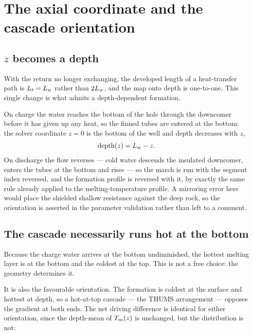 \section{The axial coordinate and the cascade orientation}
\label{sec:coordinate}

\subsection{$z$ becomes a depth}

With the return no longer exchanging, the developed length of a heat-transfer
path is $L_t = L_{w}$ rather than $2L_{w}$, and the map onto depth is one-to-one.
This single change is what admits a depth-dependent formation.

On charge the water reaches the bottom of the hole through the downcomer
before it has given up any heat, so the finned tubes are entered at the
bottom: the solver coordinate $z = 0$ is the bottom of the well and depth
decreases with $z$,
\begin{equation}
\text{depth}(z) = L_{w} - z .
\end{equation}
On discharge the flow reverses --- cold water descends the insulated
downcomer, enters the tubes at the bottom and rises --- so the march is run
with the segment index reversed, and the formation profile is reversed with
it, by exactly the same rule already applied to the melting-temperature
profile. A mirroring error here would place the shielded shallow resistance
against the deep rock, so the orientation is asserted in the parameter
validation rather than left to a comment.

\subsection{The cascade necessarily runs hot at the bottom}

Because the charge water arrives at the bottom undiminished, the hottest
melting layer is at the bottom and the coldest at the top. This is not a free
choice: the geometry determines it.

It is also the favourable orientation. The formation is coldest at the surface
and hottest at depth, so a hot-at-top cascade --- the THUMS arrangement ---
opposes the gradient at both ends. The net driving difference is identical for
either orientation, since the depth-mean of $T_{m}(z)$ is unchanged, but the
distribution is not:

